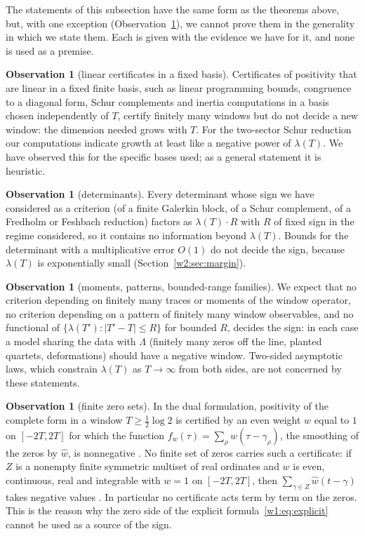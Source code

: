 \documentclass[11pt]{amsart}
\theoremstyle{definition}
\newtheorem{observation}[theorem]{Observation}
\theoremstyle{remark}
\numberwithin{equation}{section}
\newcommand{\lam}{\lambda(T)}                          %
\begin{document}
The statements of this subsection have the same form as the theorems above, but, with one exception
(Observation~\ref{w3:bar:B5}), we cannot prove them in the generality in which we state them. Each is given with the
evidence we have for it, and none is used as a premise.

\begin{observation}[linear certificates in a fixed basis]\label{w3:bar:B2}
Certificates of positivity that are linear in a fixed finite basis, such as linear programming bounds,
congruence to a diagonal form, Schur complements and inertia computations in a basis chosen independently of
$T$, certify finitely many windows but do not decide a new window: the dimension needed grows with
$T$. For the two-sector Schur reduction our computations indicate growth at least like a negative power of $\lam$.
We have observed this for the specific bases used; as a general statement it is heuristic.
\end{observation}

\begin{observation}[determinants]\label{w3:bar:B3}
Every determinant whose sign we have considered as a criterion (of a finite Galerkin block, of a Schur complement,
of a Fredholm or Feshbach reduction) factors as $\lam\cdot R$ with $R$ of fixed sign in the regime considered, so it
contains no information beyond $\lam$. Bounds for the determinant with a multiplicative error $O(1)$ do not decide
the sign, because $\lam$ is exponentially small (Section~\ref{w2:sec:margin}).
\end{observation}

\begin{observation}[moments, patterns, bounded-range families]\label{w3:bar:B4b}
We expect that no criterion depending on finitely many traces or moments of the window operator, no criterion
depending on a pattern of finitely many window observables, and no functional of $\{\lambda(T'):|T'-T|\le R\}$ for
bounded $R$, decides the sign: in each case a model sharing the data with $\Lambda$ (finitely many zeros off the
line, planted quartets, deformations) should have a negative window. Two-sided asymptotic laws, which constrain
$\lambda(T)$ as $T\to\infty$ from both sides, are not concerned by these statements.
\end{observation}

\begin{observation}[finite zero sets]\label{w3:bar:B5}
In the dual formulation, positivity of the complete form in a window $T\ge\frac12\log2$ is certified by an even
weight $w$ equal to $1$ on $[-2T,2T]$ for which the function $f_w(\tau)=\sum_\rho\widehat w(\tau-\gamma_\rho)$, the
smoothing of the zeros by $\widehat w$, is nonnegative \cite[Theorems~6.2 and~8.2]{P46}. No finite set of zeros
carries such a certificate: if $Z$ is a nonempty finite symmetric multiset of real ordinates and $w$ is even,
continuous, real and integrable with $w=1$ on $[-2T,2T]$, then $\sum_{\gamma\in Z}\widehat w(t-\gamma)$ takes
negative values \cite[Theorem~6.5]{P46}. In particular no certificate acts term by term on the zeros. This is the
reason why the zero side of the explicit formula~\eqref{w1:eq:explicit} cannot be used as a source of the sign.
\end{observation}
\end{document}
